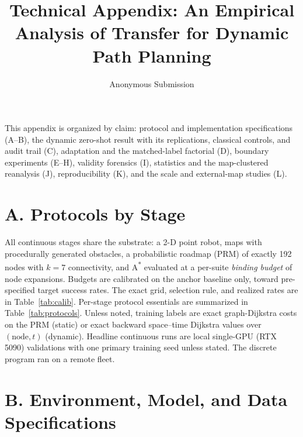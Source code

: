 \documentclass[letterpaper]{article} %
\title{Technical Appendix: An Empirical Analysis of Transfer for Dynamic Path Planning}
\author{Anonymous Submission}
\begin{document}
\maketitle
{\renewcommand{\thefootnote}{}}

This appendix is organized by claim: protocol and implementation specifications (A--B), the dynamic zero-shot result with its replications, classical controls, and audit trail (C), adaptation and the matched-label factorial (D), boundary experiments (E--H), validity forensics (I), statistics and the map-clustered reanalysis (J), reproducibility (K), and the scale and external-map studies (L).

\section{A. Protocols by Stage}

All continuous stages share the substrate: a 2-D point robot, maps with procedurally generated obstacles, a probabilistic roadmap (PRM) of exactly 192 nodes with $k{=}7$ connectivity, and A\textsuperscript{*} evaluated at a per-suite \emph{binding budget} of node expansions. Budgets are calibrated on the anchor baseline only, toward pre-specified target success rates. The exact grid, selection rule, and realized rates are in Table~\ref{tab:calib}. Per-stage protocol essentials are summarized in Table~\ref{tab:protocols}. Unless noted, training labels are exact graph-Dijkstra costs on the PRM (static) or exact backward space--time Dijkstra values over $(\text{node},t)$ (dynamic). Headline continuous runs are local single-GPU (RTX 5090) validations with one primary training seed unless stated. The discrete program ran on a remote fleet.

\section{B. Environment, Model, and Data Specifications}
\end{document}

